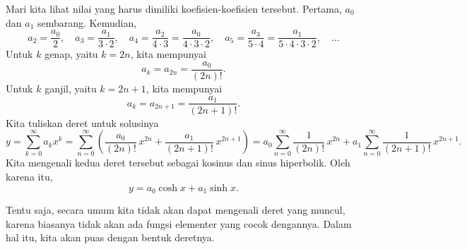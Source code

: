 \begin{example}
Mari kita lihat nilai yang harus dimiliki
koefisien-koefisien tersebut. Pertama, $a_0$ dan $a_1$ sembarang. Kemudian,
\begin{equation*}
a_2 = \frac{a_0}{2}, \quad
a_3 = \frac{a_1}{3 \cdot 2}, \quad
a_4 = \frac{a_2}{4 \cdot 3} = \frac{a_0}{4 \cdot 3 \cdot 2}, \quad
a_5 = \frac{a_3}{5 \cdot 4} = \frac{a_1}{5 \cdot 4 \cdot 3 \cdot 2}, \quad \ldots
\end{equation*}
Untuk $k$ genap, yaitu $k=2n$,
kita mempunyai
\begin{equation*}
a_k = a_{2n} = \frac{a_0}{(2n)!} .
\end{equation*}
Untuk $k$ ganjil, yaitu $k=2n+1$, kita mempunyai
\begin{equation*}
a_k = a_{2n+1} = \frac{a_1}{(2n+1)!} .
\end{equation*}
Kita tuliskan deret untuk solusinya
\begin{equation*}
y
=
\sum_{k=0}^\infty
a_k x^k
=
\sum_{n=0}^\infty
\left(
\frac{a_0}{(2n)!} \,x^{2n}
+
\frac{a_1}{(2n+1)!} \,x^{2n+1}
\right)
=
a_0
\sum_{n=0}^\infty
\frac{1}{(2n)!} \,x^{2n}
+
a_1
\sum_{n=0}^\infty
\frac{1}{(2n+1)!} \,x^{2n+1} .
\end{equation*}
Kita mengenali kedua deret tersebut sebagai kosinus dan sinus hiperbolik.
Oleh karena itu,
\begin{equation*}
y =
a_0 \cosh x + a_1 \sinh x .
\end{equation*}
\end{example}

Tentu saja, secara umum kita tidak akan dapat mengenali 
deret yang muncul, karena biasanya tidak akan ada
fungsi elementer yang cocok dengannya. Dalam hal itu, kita akan
puas dengan bentuk deretnya.

